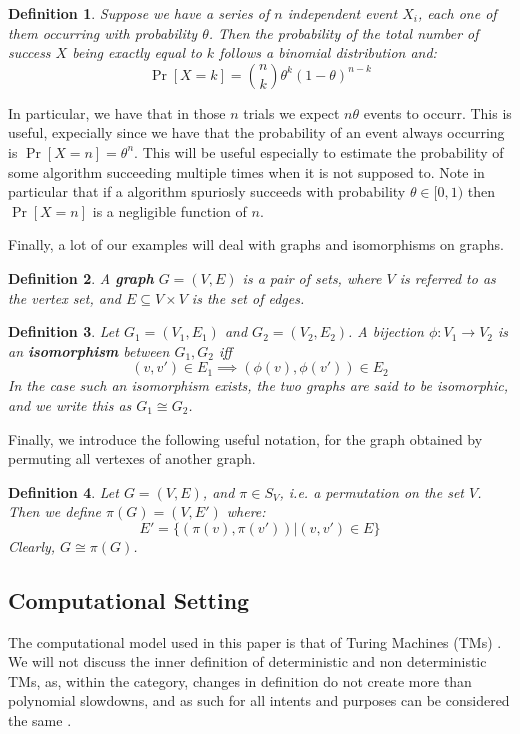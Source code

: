 \documentclass{article}
\newtheorem{definition}{Definition}
\begin{document}
\begin{definition}
    Suppose we have a series of $n$ independent event $X_i$, each one of them 
    occurring with probability $\theta$. Then the probability of the total number of success $X$ being exactly equal to $k$ follows a binomial distribution and:
    \[ \Pr[X = k] = \binom{n}{k} \theta^k (1 - \theta)^{n - k} \]
\end{definition}
In particular, we have that in those $n$ trials we expect $n\theta$ events to occurr. This is useful, expecially since 
    we have that the probability of an event always occurring is $\Pr[X = n] = \theta^n$. This will be useful especially 
    to  estimate the probability of some algorithm succeeding multiple times when it is not supposed to. 
    Note in particular that if a algorithm spuriosly succeeds with probability $\theta \in [0, 1)$ then $\Pr[X = n]$ is a 
    negligible function of $n$. \par

Finally, a lot of our examples will deal with graphs and isomorphisms on graphs.

\begin{definition}
A \textbf{graph} $G = (V, E)$ is a pair of sets, where $V$ is referred to as the vertex set, and $E \subseteq V \times V$ is the set of edges.  
\end{definition}

\begin{definition}
    Let $G_1 = (V_1, E_1)$ and $G_2 = (V_2, E_2)$. A bijection $\phi: V_1 \to V_2$ is an \textbf{isomorphism} between $G_1, G_2$ iff 
    \[ (v, v') \in E_1 \implies (\phi(v), \phi(v')) \in E_2 \] 
    In the case such an isomorphism exists, the two graphs are said to be isomorphic, and we write this as $G_1 \cong G_2$. 
\end{definition}

Finally, we introduce the following useful notation, for the graph obtained by permuting all vertexes of another graph.
\begin{definition}
    Let $G = (V, E)$, and $\pi \in S_V$, i.e. a permutation on the set $V$. Then we define $\pi(G) = (V, E')$ where:
    \[ E' = \{ (\pi(v), \pi(v')) | (v, v') \in E \} \]
    Clearly, $G \cong \pi(G)$.
\end{definition}

\subsection{Computational Setting}
The computational model used in this paper is that of Turing Machines (TMs) \cite{turingComputableNumbersApplication1937}. We will not discuss the inner definition of deterministic and non deterministic TMs, as, within the category, changes in definition do not create more than polynomial slowdowns, and as such for all intents and purposes can be considered the same \cite{aroraComputationalComplexityModern2009}. 
\end{document}
